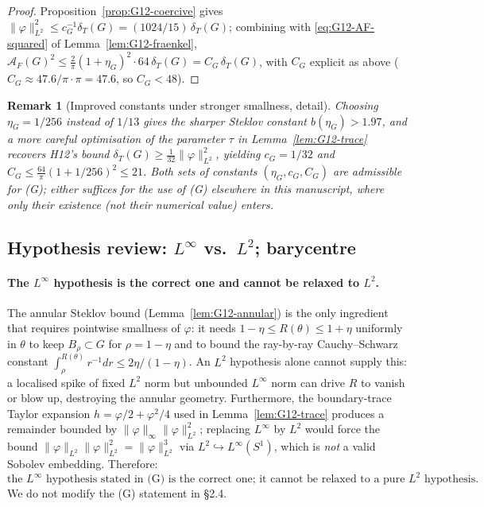 \documentclass[11pt]{amsart}
\newtheorem{remark}[theorem]{Remark}
\newcommand{\dT}{\delta_T}
\newcommand{\AF}{\mathcal A_F}
\begin{document}
\begin{proof}
Proposition~\ref{prop:G12-coercive} gives
\(\|\varphi\|_{L^2}^2\le c_G^{-1}\dT(G)=(1024/15)\,\dT(G)\);
combining with
\eqref{eq:G12-AF-squared} of Lemma~\ref{lem:G12-fraenkel},
\(\AF(G)^2\le\tfrac{2}{\pi}(1+\eta_G)^2\cdot 64\,\dT(G)
=C_G\,\dT(G)\), with \(C_G\) explicit as above
(\(C_G\approx 47.6/\pi\cdot \pi=47.6\), so \(C_G<48\)).
\end{proof}

\begin{remark}[Improved constants under stronger smallness, detail]
\label{rem:G12detail}
Choosing \(\eta_G=1/256\) instead of \(1/13\) gives the sharper
Steklov constant \(b(\eta_G)>1.97\), and a more careful
optimisation of the parameter \(\tau\) in Lemma~\ref{lem:G12-trace}
recovers H12's bound
\(\dT(G)\ge\tfrac{1}{32}\|\varphi\|_{L^2}^2\), yielding
\(c_G=1/32\) and \(C_G\le\tfrac{64}{\pi}(1+1/256)^2\le 21\).  Both
sets of constants \((\eta_G,c_G,C_G)\) are admissible for (G);
either suffices for the use of (G) elsewhere in this manuscript,
where only their existence (not their numerical value) enters.
\end{remark}

\subsection{Hypothesis review: \(L^\infty\) vs.\ \(L^2\); barycentre}
\label{ss:G12-review}

\paragraph{The \(L^\infty\) hypothesis is the correct one and cannot
be relaxed to \(L^2\).}
The annular Steklov bound (Lemma~\ref{lem:G12-annular}) is the only
ingredient that requires pointwise smallness of \(\varphi\): it
needs \(1-\eta\le R(\theta)\le 1+\eta\) uniformly in \(\theta\) to
keep \(B_\rho\subset G\) for \(\rho=1-\eta\) and to bound the
ray-by-ray Cauchy--Schwarz constant
\(\int_\rho^{R(\theta)}r^{-1}dr\le 2\eta/(1-\eta)\).  An \(L^2\)
hypothesis alone cannot supply this: a localised spike of fixed
\(L^2\) norm but unbounded \(L^\infty\) norm can drive \(R\) to
vanish or blow up, destroying the annular geometry.  Furthermore,
the boundary-trace Taylor expansion \(h=\varphi/2+\varphi^2/4\)
used in Lemma~\ref{lem:G12-trace} produces a remainder bounded by
\(\|\varphi\|_\infty\|\varphi\|_{L^2}^2\); replacing \(L^\infty\) by
\(L^2\) would force the bound
\(\|\varphi\|_{L^2}\|\varphi\|_{L^2}^2=\|\varphi\|_{L^2}^3\) via
\(L^2\hookrightarrow L^\infty(S^1)\), which is \emph{not} a valid
Sobolev embedding.  Therefore:
\[
   \boxed{\text{the \(L^\infty\) hypothesis stated in (G) is the
   correct one; it cannot be relaxed to a pure \(L^2\) hypothesis.}}
\]
We do not modify the (G) statement in \S2.4.
\end{document}
